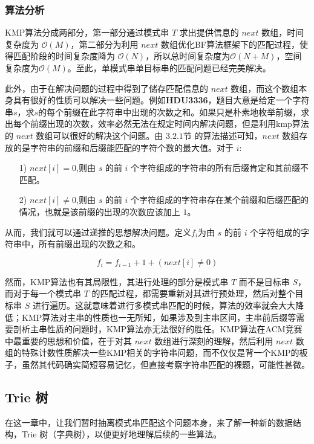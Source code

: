 \documentclass[UTF8]{ctexart}
\begin{document}
\subsubsection {算法分析}
KMP算法分成两部分，第一部分通过模式串 $T$ 求出提供信息的 $next$ 数组，时间复杂度为 $\mathcal{O}(M)$，第二部分为利用 $next$ 数组优化BF算法框架下的匹配过程，使得匹配阶段的时间复杂度降为 $\mathcal{O}(N)$，所以总时间复杂度为$\mathcal{O}(N+M)$，空间复杂度为$\mathcal{O}(M)$。至此，单模式串单目标串的匹配问题已经完美解决。 \par
此外，由于在解决问题的过程中得到了储存匹配信息的 $next$ 数组，而这个数组本身具有很好的性质可以解决一些问题。例如\textbf{HDU3336}，题目大意是给定一个字符串$s$，求$s$的每个前缀在此字符串中出现的次数之和。如果只是朴素地枚举前缀，求出每个前缀出现的次数，效率必然无法在规定时间内解决问题，但是利用kmp算法的 $next$ 数组可以很好的解决这个问题。由 $3.2.1节$ 的算法描述可知，$next$ 数组存放的是字符串的前缀和后缀能匹配的字符个数的最大值。对于 $i$:
\begin{itemize}
  \item [1)] $next[i]  = 0$,则由 $s$ 的前 $i$ 个字符组成的字符串的所有后缀肯定和其前缀不匹配。
  \item [2)] $next[i]  \ne 0$,则由 $s$ 的前 $i$ 个字符组成的字符串存在某个前缀和后缀匹配的情况，也就是该前缀的出现的次数应该加上 $1$。
\end{itemize}
从而，我们就可以通过递推的思想解决问题。定义$f_i$为由 $s$ 的前 $i$ 个字符组成的字符串中，所有前缀出现的次数之和。

\begin{equation} 
f_i = f_{i-1} + 1 + (next[i] \ne 0)
\end{equation}

然而，KMP算法也有其局限性，其进行处理的部分是模式串 $T$ 而不是目标串 $S$，而对于每一个模式串 $T$ 的匹配过程，都需要重新对其进行预处理，然后对整个目标串 $S$ 进行遍历。这就意味着进行多模式串匹配的时候，算法的效率就会大大降低；KMP算法对主串的性质也一无所知，如果涉及到主串区间，主串前后缀等需要剖析主串性质的问题时，KMP算法亦无法很好的胜任。KMP算法在ACM竞赛中最重要的思想和价值，在于对其 $next$ 数组进行深刻的理解，然后利用 $next$ 数组的特殊计数性质解决一些KMP相关的字符串问题，而不仅仅是背一个KMP的板子，虽然其代码确实简短容易记忆，但直接考察字符串匹配的裸题，可能性甚微。

\subsection {Trie 树}

在这一章中，让我们暂时抽离模式串匹配这个问题本身，来了解一种新的数据结构，Trie 树（字典树），以便更好地理解后续的一些算法。
\end{document}
